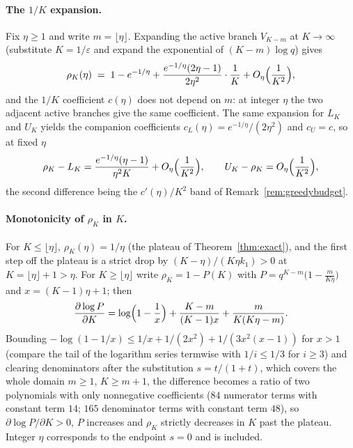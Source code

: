 \paragraph{The $1/K$ expansion.}
Fix $\eta\ge1$ and write $m=\lfloor\eta\rfloor$.  Expanding the active
branch $V_{K-m}$ at $K\to\infty$ (substitute $K=1/\varepsilon$ and expand
the exponential of $(K-m)\log q$) gives
\[
  \rho_K(\eta)\;=\;1-e^{-1/\eta}
  +\frac{e^{-1/\eta}(2\eta-1)}{2\eta^{2}}\cdot\frac1K
  +O_\eta\Bigl(\frac1{K^{2}}\Bigr),
\]
and the $1/K$ coefficient $c(\eta)$ does not depend on $m$: at integer
$\eta$ the two adjacent active branches give the same coefficient.  The
same expansion for $L_K$ and $U_K$ yields the companion coefficients
$c_L(\eta)=e^{-1/\eta}/(2\eta^{2})$ and $c_U=c$, so at fixed $\eta$
\[
  \rho_K-L_K=\frac{e^{-1/\eta}(\eta-1)}{\eta^{2}K}+O_\eta\Bigl(\frac1{K^{2}}\Bigr),
  \qquad
  U_K-\rho_K=O_\eta\Bigl(\frac1{K^{2}}\Bigr),
\]
the second difference being the $c'(\eta)/K^{2}$ band of
Remark~\ref{rem:greedybudget}.

\paragraph{Monotonicity of $\rho_K$ in $K$.}
For $K\le\lfloor\eta\rfloor$, $\rho_K(\eta)=1/\eta$ (the plateau of
Theorem~\ref{thm:exact}), and the first step off the plateau is a strict
drop by $(K-\eta)/(K\eta k_1)>0$ at $K=\lfloor\eta\rfloor+1>\eta$.  For
$K\ge\lfloor\eta\rfloor$ write $\rho_K=1-P(K)$ with
$P=q^{K-m}\bigl(1-\tfrac m{K\eta}\bigr)$ and $x=(K-1)\eta+1$; then
\[
  \frac{\partial\log P}{\partial K}
  =\log\Bigl(1-\frac1x\Bigr)+\frac{K-m}{(K-1)x}+\frac{m}{K(K\eta-m)} .
\]
Bounding $-\log(1-1/x)\le1/x+1/(2x^{2})+1/(3x^{2}(x-1))$ for $x>1$
(compare the tail of the logarithm series termwise with $1/i\le1/3$ for
$i\ge3$) and clearing denominators after the substitution $s=t/(1+t)$,
which covers the whole domain $m\ge1$, $K\ge m+1$, the difference becomes
a ratio of two polynomials with only nonnegative coefficients ($84$
numerator terms with constant term $14$; $165$ denominator terms with
constant term $48$), so $\partial\log P/\partial K>0$, $P$ increases and
$\rho_K$ strictly decreases in $K$ past the plateau.  Integer $\eta$
corresponds to the endpoint $s=0$ and is included.

